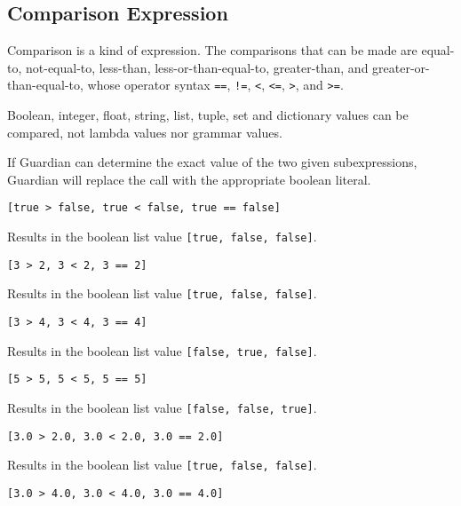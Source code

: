 
\subsection{Comparison Expression}
{
	Comparison is a kind of expression. The comparisons that can be made
	are equal-to, not-equal-to,
	less-than, less-or-than-equal-to,
	greater-than, and greater-or-than-equal-to,
	whose operator syntax
	\texttt{==}, \texttt{!=},
	\texttt{<}, \texttt{<=},
	\texttt{>}, and \texttt{>=}.
	
	Boolean, integer, float, string, list, tuple, set and dictionary values
	can be compared, not lambda values nor grammar values.
	
	If Guardian can determine the exact value of the two given subexpressions,
	Guardian will replace the call with the appropriate boolean literal.
	
	\begin{itemize}
	{
		\item[] \lstinline[language=MAIA, columns=fixed]@[true > false, true < false, true == false]@
		
			Results in the boolean list value \lstinline[language=MAIA, columns=fixed]@[true, false, false]@.
			
		\item[] \lstinline[language=MAIA, columns=fixed]@[3 > 2, 3 < 2, 3 == 2]@
		
			Results in the boolean list value \lstinline[language=MAIA, columns=fixed]@[true, false, false]@.
			
		\item[] \lstinline[language=MAIA, columns=fixed]@[3 > 4, 3 < 4, 3 == 4]@
		
			Results in the boolean list value \lstinline[language=MAIA, columns=fixed]@[false, true, false]@.
			
		\item[] \lstinline[language=MAIA, columns=fixed]@[5 > 5, 5 < 5, 5 == 5]@
		
			Results in the boolean list value \lstinline[language=MAIA, columns=fixed]@[false, false, true]@.
			
		\item[] \lstinline[language=MAIA, columns=fixed]@[3.0 > 2.0, 3.0 < 2.0, 3.0 == 2.0]@
		
			Results in the boolean list value \lstinline[language=MAIA, columns=fixed]@[true, false, false]@.
			
		\item[] \lstinline[language=MAIA, columns=fixed]@[3.0 > 4.0, 3.0 < 4.0, 3.0 == 4.0]@
		
}
\end{itemize}}
